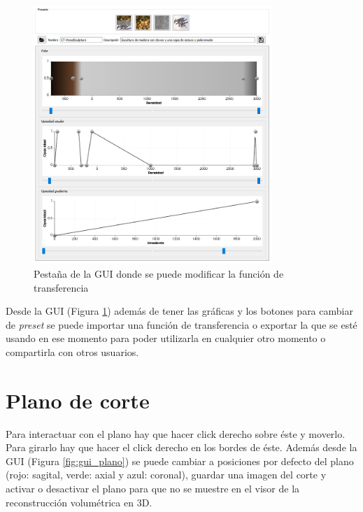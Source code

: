 \begin{figure}[H]
	\centering
	\includegraphics[width=9cm]{imagenes/pestana_funcion_de_transferencia}
	\caption{Pestaña de la GUI donde se puede modificar la función de transferencia}
	\label{fig:pestana_funcion_de_transferencia}
\end{figure}

Desde la GUI (Figura \ref{fig:pestana_funcion_de_transferencia}) además de tener las gráficas y los botones para cambiar de \textit{preset} se puede importar una función de transferencia o exportar la que se esté usando en ese momento para poder utilizarla en cualquier otro momento o compartirla con otros usuarios.

\section{Plano de corte}

Para interactuar con el plano hay que hacer click derecho sobre éste y moverlo. Para girarlo hay que hacer el click derecho en los bordes de éste. Además desde la GUI (Figura \ref{fig:gui_plano}) se puede cambiar a posiciones por defecto del plano (rojo: sagital, verde: axial y azul: coronal), guardar una imagen del corte y activar o desactivar el plano para que no se muestre en el visor de la reconstrucción volumétrica en 3D.

